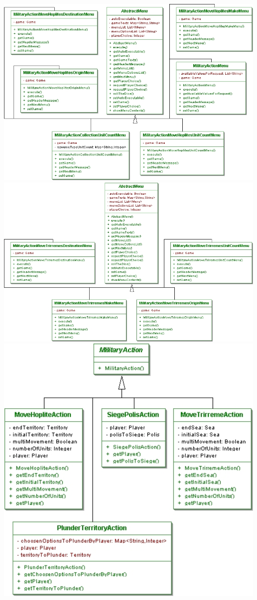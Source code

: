 \documentclass[11 pt]{book}
\begin{document}
\begin{center}
		    \includegraphics[width=500px]{design-uml/iteration7/militaryactions2.jpg}
		    \includegraphics[width=500px]{design-uml/iteration7/militaryactions3.jpg}
		    \includegraphics[width=500px]{design-uml/iteration7/military actions.jpg}

\end{center}
\end{document}
